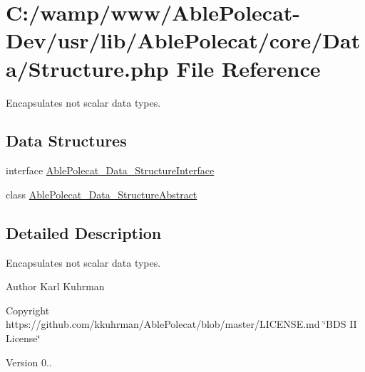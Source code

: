 \hypertarget{_structure_8php}{}\section{C\+:/wamp/www/\+Able\+Polecat-\/\+Dev/usr/lib/\+Able\+Polecat/core/\+Data/\+Structure.php File Reference}
\label{_structure_8php}


Encapsulates not scalar data types.  


\subsection*{Data Structures}
\begin{DoxyCompactItemize}
\item 
interface \hyperlink{interface_able_polecat___data___structure_interface}{Able\+Polecat\+\_\+\+Data\+\_\+\+Structure\+Interface}
\item 
class \hyperlink{class_able_polecat___data___structure_abstract}{Able\+Polecat\+\_\+\+Data\+\_\+\+Structure\+Abstract}
\end{DoxyCompactItemize}


\subsection{Detailed Description}
Encapsulates not scalar data types. 

\begin{DoxyAuthor}{Author}
Karl Kuhrman 
\end{DoxyAuthor}
\begin{DoxyCopyright}{Copyright}
https\+://github.com/kkuhrman/\+Able\+Polecat/blob/master/\+L\+I\+C\+E\+N\+S\+E.\+md \char`\"{}\+B\+D\+S I\+I License\char`\"{} 
\end{DoxyCopyright}
\begin{DoxyVersion}{Version}
0.. 
\end{DoxyVersion}
